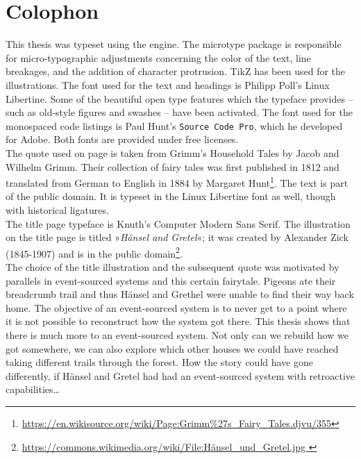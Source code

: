 \cleardoublepage

\chapter*{Colophon}

This thesis was typeset using the \XeTeX{} engine. The microtype package is 
responsible for micro-typographic adjustments concerning the color of the text, 
line breakages, and the addition of character protrusion. TikZ has been used 
for the illustrations.
The font used for the text and headings is Philipp Poll's Linux Libertine. 
Some of the beautiful open type features which the typeface provides -- such 
as old-style figures and swashes -- have been activated. The font used for the 
monospaced code listings is Paul Hunt's \texttt{Source Code Pro}, which he 
developed for Adobe. Both fonts are provided under free licenses.\\

\noindent{}The quote used on page \pageref{page:quote} is taken from Grimm's 
Household Tales by Jacob and Wilhelm Grimm. Their collection of fairy tales 
was first published in 1812 and translated from German to English in 1884 by 
Margaret Hunt\footnote[1]{\href{https://en.wikisource.org/wiki/Page:Grimm\%27s_Fairy_Tales.djvu/355}{https://en.wikisource.org/wiki/Page:Grimm\%27s\_Fairy\_Tales.djvu/355}}. 
The text is part of the public domain. It is typeset in the Linux Libertine 
font as well, though with historical ligatures.\\

\noindent{}The title page typeface is Knuth's \textsf{Computer Modern Sans Serif}.
The illustration on the title page is titled »\emph{H\"ansel and Gretel}«;
it was created by Alexander Zick (1845-1907) and is in the public 
domain\footnote[2]{\href{https://commons.wikimedia.org/wiki/File:H\%C3\%A4nsel_und_Gretel.jpg}{https://commons.wikimedia.org/wiki/File:H\"ansel\_und\_Gretel.jpg 
}}.\\

\noindent{}The choice of the title illustration and the subsequent quote was
motivated by parallels in event-sourced systems and this certain fairytale. 
Pigeons ate their breadcrumb trail and thus H\"ansel and Grethel were unable 
to find their way back home. %
The objective of an event-sourced system is to never get to a point where it 
is not possible to reconstruct how the system got there. 
This thesis shows that there is much more to an event-sourced system. Not only 
can we rebuild how we got somewhere, we can also explore which other houses we 
could have reached taking different trails through the forest. How the story 
could have gone differently, if H\"ansel and Gretel had had an event-sourced 
system with retroactive capabilities\dots{}
